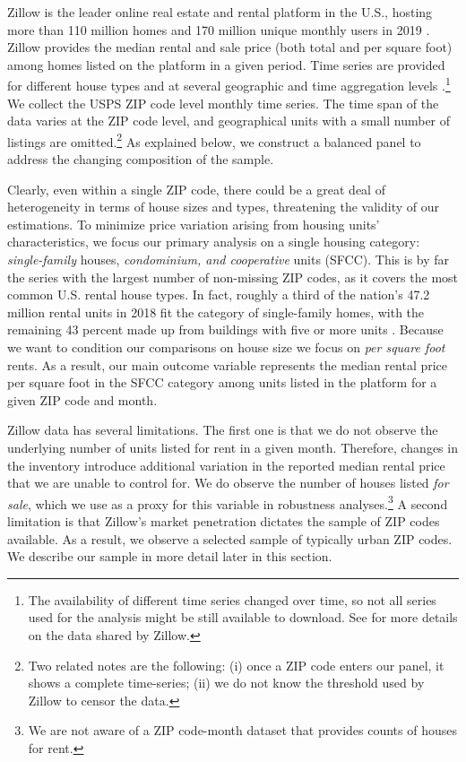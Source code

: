 Zillow is the leader online real estate and rental platform in the U.S., hosting more 
than 110 million homes and 170 million unique monthly users in 2019 
\parencite{ZillowFacts}. Zillow provides the median rental and sale price (both 
total and per square foot) among homes listed on the platform in a given period. Time 
series are provided for different house types and at several geographic and time 
aggregation levels \parencite{ZillowData}.\footnote{The availability of different time 
	series changed over time, so not all series used for the analysis might be still 
	available to download. See \textcite{ZillowData} for more details on the data shared 
	by Zillow.} 
We collect the USPS ZIP code level monthly time series. The time span of the data 
varies at the ZIP code level, and geographical units with a small number of listings
are omitted.\footnote{Two related notes are the following: (i) once a ZIP code enters 
	our panel, it shows a complete time-series; (ii) we do not know the threshold used 
	by Zillow to censor the data.} 
As explained below, we construct a balanced panel to address the changing composition 
of the sample.

Clearly, even within a single ZIP code, there could be a great deal of heterogeneity in 
terms of house sizes and types, threatening the validity of our estimations.
To minimize price variation arising from housing units' characteristics, we focus 
our primary analysis on a single housing category: \textit{single-family} houses, 
\textit{condominium, and cooperative} units (SFCC). This is by far the series with the 
largest number of non-missing ZIP codes, as it covers the most common U.S. rental house 
types. In fact, roughly a third of the nation's 47.2 million rental units in 2018 fit the 
category of single-family homes, with the remaining 43 percent made up from buildings with 
five or more units \parencite{fernald2020americas}. Because we want to condition our 
comparisons on house size we focus on \textit{per square foot} rents. As a result, our main 
outcome variable represents the median rental price per square foot in the SFCC category 
among units listed in the platform for a given ZIP code and month. 

Zillow data has several limitations. The first one is that we do not observe the 
underlying number of units listed for rent in a given month. Therefore, changes in the 
inventory introduce additional variation in the reported median rental price that we 
are unable to control for. We do observe the number of houses listed \textit{for sale}, 
which we use as a proxy for this variable in robustness analyses.\footnote{We are not 
	aware of a ZIP code-month dataset that provides counts of houses for rent.}
A second limitation is that Zillow's market penetration dictates the sample of ZIP codes 
available. As a result, we observe a selected sample of typically urban ZIP codes. We 
describe our sample in more detail later in this section.


